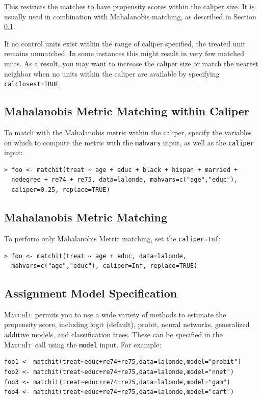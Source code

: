 \documentclass[oneside,letterpaper,titlepage]{article}
\newcommand{\MatchIt}{\textsc{MatchIt}}
\begin{document}
This restricts the matches to have propensity scores within the
caliper size.  It is usually used in combination with Mahalanobis
matching, as described in Section \ref{mahal}.

If no control units exist within the range of caliper specified, the
treated unit remains unmatched.  In some instances this might result
in very few matched units.  As a result, you may want to increase the
caliper size or match the nearest neighbor when no units within the
caliper are available by specifying \texttt{calclosest=TRUE}.

\subsection{Mahalanobis Metric Matching within Caliper}
\label{mahal}
To match with the Mahalanobis metric within the caliper, specify the
variables on which to compute the metric with the \texttt{mahvars}
input, as well as the \texttt{caliper} input:

\begin{verbatim}
> foo <- matchit(treat ~ age + educ + black + hispan + married +
  nodegree + re74 + re75, data=lalonde, mahvars=c("age","educ"),
  caliper=0.25, replace=TRUE)
\end{verbatim}

\subsection{Mahalanobis Metric Matching}

To perform only Mahalanobis Metric matching, set the
\texttt{caliper=Inf}:

\begin{verbatim}
> foo <- matchit(treat ~ age + educ, data=lalonde,
  mahvars=c("age","educ"), caliper=Inf, replace=TRUE)
\end{verbatim}

\subsection{Assignment Model Specification}

\MatchIt\ permits you to use a wide variety of methods to
estimate the propensity score, including logit (default), probit,
neural networks, generalized additive models, and classification
trees.  These can be specified in the \MatchIt\ call using the
\texttt{model} input.  For example:

\begin{verbatim}
foo1 <- matchit(treat~educ+re74+re75,data=lalonde,model="probit")
foo2 <- matchit(treat~educ+re74+re75,data=lalonde,model="nnet")
foo3 <- matchit(treat~educ+re74+re75,data=lalonde,model="gam")
foo4 <- matchit(treat~educ+re74+re75,data=lalonde,model="cart")
\end{verbatim}
\end{document}
